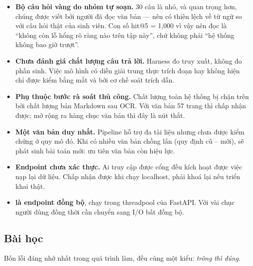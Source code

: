\begin{itemize}
  \item \textbf{Bộ câu hỏi vàng do nhóm tự soạn.} 30 câu là nhỏ, và quan trọng hơn, chúng được
  viết bởi người đã đọc văn bản — nên có thiên lệch về từ ngữ so với câu hỏi thật của sinh
  viên. Con số hit@5 = 1,000 vì vậy nên đọc là “không còn lỗ hổng rõ ràng nào trên tập này”,
  chứ không phải “hệ thống không bao giờ trượt”.
  \item \textbf{Chưa đánh giá chất lượng câu trả lời.} Harness đo truy xuất, không đo phần
  sinh. Việc mô hình có diễn giải trung thực trích đoạn hay không hiện chỉ được kiểm bằng mắt
  và bởi cơ chế soát trích dẫn.
  \item \textbf{Phụ thuộc bước rà soát thủ công.} Chất lượng toàn hệ thống bị chặn trên bởi
  chất lượng bản Markdown sau OCR. Với văn bản 57 trang thì chấp nhận được; mở rộng ra hàng
  chục văn bản thì đây là nút thắt.
  \item \textbf{Một văn bản duy nhất.} Pipeline hỗ trợ đa tài liệu nhưng chưa được kiểm chứng ở
  quy mô đó. Khi có nhiều văn bản chồng lấn (quy định cũ – mới), sẽ phát sinh bài toán mới: ưu
  tiên văn bản còn hiệu lực.
  \item \textbf{Endpoint  chưa xác thực.} Ai truy cập được cổng đều kích hoạt
  được việc nạp lại dữ liệu. Chấp nhận được khi chạy localhost, phải khoá lại nếu triển khai
  thật.
  \item \textbf{ là endpoint đồng bộ}, chạy trong threadpool của FastAPI. Với vài
  chục người dùng đồng thời cần chuyển sang I/O bất đồng bộ.
\end{itemize}

\subsection{Bài học}

Bốn lỗi đáng nhớ nhất trong quá trình làm, đều cùng một kiểu: \emph{trông thì đúng}.

